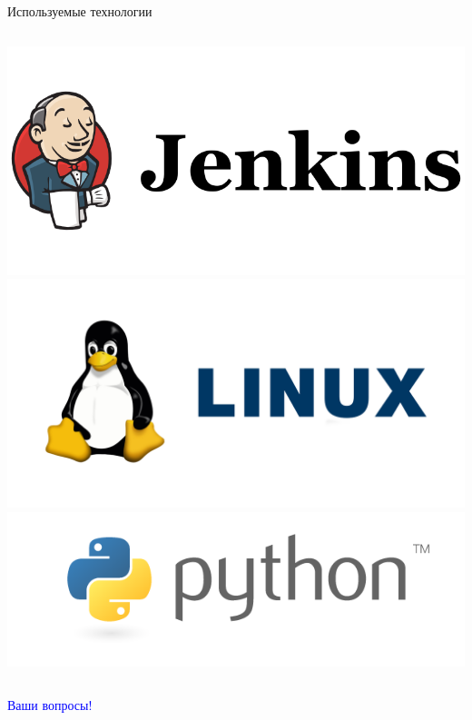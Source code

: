 \documentclass{beamer} %
\begin{document}
\begin{frame}{Используемые технологии}
\begin{columns}
    \begin{column}{0.3\linewidth}
      \begin{center}
        \includegraphics[width=\textwidth]{jenkins_logo.png}
        \includegraphics[width=\textwidth]{linux_logo.png}
        \includegraphics[width=\textwidth]{python_logo.png}
      \end{center}
    \end{column}
  \end{columns}
\end{frame}




\begin{frame}
  \centering \Huge \textcolor{blue}{Ваши вопросы!}
\end{frame}
\end{document}
